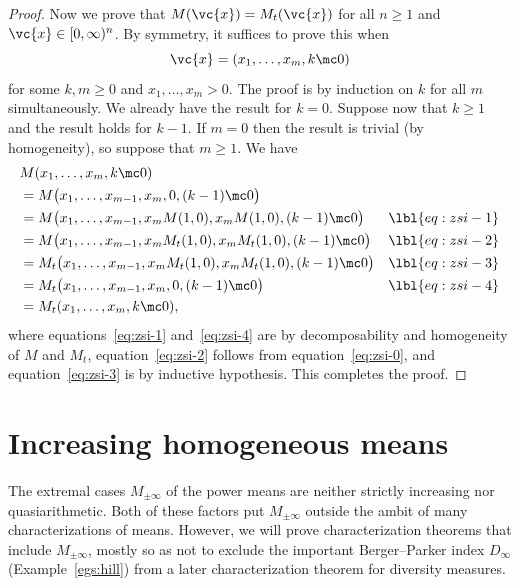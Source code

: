 \begin{proof}
Now we prove that $M(\vc{x}) = M_t(\vc{x})$ for all $n \geq 1$ and $\vc{x}
\in [0, \infty)^n$.  By symmetry, it suffices to prove this when
\[
\vc{x} = (x_1, \ldots, x_m, k \mc 0)
\]
for some $k, m \geq 0$ and $x_1, \ldots, x_m > 0$.  The proof is by
induction on $k$ for all $m$ simultaneously.  We already have the result
for $k = 0$.  Suppose now that $k \geq 1$ and the result holds for $k - 1$.
If $m = 0$ then the result is trivial (by homogeneity), so suppose
that $m \geq 1$.  We have
% 
\begin{align}
&
M(x_1, \ldots, x_m, k \mc 0)    
\nonumber       \\
&
=
M\bigl(x_1, \ldots, x_{m - 1}, x_m, 0, (k - 1) \mc 0\bigr)&
\nonumber       \\
&
=
M\bigl(x_1, \ldots, x_{m - 1}, x_m M(1, 0), x_m M(1, 0), (k - 1) \mc 0\bigr)&
\lbl{eq:zsi-1}        \\
&
=
M\bigl(x_1, \ldots, x_{m - 1}, 
x_m M_t(1, 0), x_m M_t(1, 0), (k - 1) \mc 0\bigr)&
\lbl{eq:zsi-2}        \\
&
=
M_t\bigl(x_1, \ldots, x_{m - 1}, 
x_m M_t(1, 0), x_m M_t(1, 0), (k - 1) \mc 0\bigr)&
\lbl{eq:zsi-3}        \\
&
=
M_t\bigl(x_1, \ldots, x_{m - 1}, x_m, 0, (k - 1) \mc 0\bigr)  &
\lbl{eq:zsi-4}        \\
&
=
M_t(x_1, \ldots, x_m, k \mc 0),
\nonumber
\end{align}
% 
where equations~\eqref{eq:zsi-1} and~\eqref{eq:zsi-4} are by
decomposability and homogeneity of $M$ and $M_t$, equation~\eqref{eq:zsi-2}
follows from equation~\eqref{eq:zsi-0}, and equation~\eqref{eq:zsi-3} is by
inductive hypothesis.  This completes the proof.
\end{proof}


\section{Increasing homogeneous means}


The extremal cases $M_{\pm\infty}$ of the power means are neither strictly
increasing nor quasiarithmetic.  Both of these factors put $M_{\pm \infty}$
outside the ambit of many characterizations of means.  However, we will
prove characterization theorems that include $M_{\pm\infty}$, mostly so as
not to exclude the important Berger--Parker%
%
%
index $D_\infty$ (Example~\ref{egs:hill}) from
a later characterization theorem for diversity measures.  

